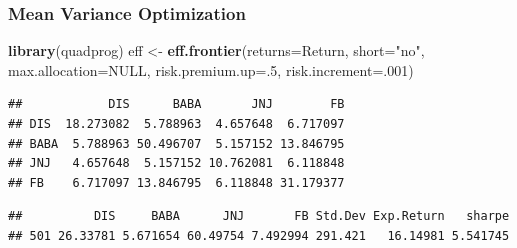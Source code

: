 \documentclass[]{article}
\newenvironment{Shaded}{\begin{snugshade}}{\end{snugshade}}
\newcommand{\KeywordTok}[1]{\textcolor[rgb]{0.13,0.29,0.53}{\textbf{#1}}}
\newcommand{\DataTypeTok}[1]{\textcolor[rgb]{0.13,0.29,0.53}{#1}}
\newcommand{\DecValTok}[1]{\textcolor[rgb]{0.00,0.00,0.81}{#1}}
\newcommand{\StringTok}[1]{\textcolor[rgb]{0.31,0.60,0.02}{#1}}
\newcommand{\OtherTok}[1]{\textcolor[rgb]{0.56,0.35,0.01}{#1}}
\newcommand{\OperatorTok}[1]{\textcolor[rgb]{0.81,0.36,0.00}{\textbf{#1}}}
\newcommand{\NormalTok}[1]{#1}
\begin{document}
\subsubsection{Mean Variance
Optimization}\label{mean-variance-optimization}

\begin{Shaded}
\begin{Highlighting}[]
\KeywordTok{library}\NormalTok{(quadprog)}
\NormalTok{eff <-}\StringTok{ }\KeywordTok{eff.frontier}\NormalTok{(}\DataTypeTok{returns=}\NormalTok{Return, }\DataTypeTok{short=}\StringTok{"no"}\NormalTok{, }\DataTypeTok{max.allocation=}\OtherTok{NULL}\NormalTok{, }\DataTypeTok{risk.premium.up=}\NormalTok{.}\DecValTok{5}\NormalTok{, }\DataTypeTok{risk.increment=}\NormalTok{.}\DecValTok{001}\NormalTok{)}
\end{Highlighting}
\end{Shaded}

\begin{verbatim}
##            DIS      BABA       JNJ        FB
## DIS  18.273082  5.788963  4.657648  6.717097
## BABA  5.788963 50.496707  5.157152 13.846795
## JNJ   4.657648  5.157152 10.762081  6.118848
## FB    6.717097 13.846795  6.118848 31.179377
\end{verbatim}

\begin{Shaded}
\end{Shaded}

\begin{verbatim}
##          DIS     BABA      JNJ       FB Std.Dev Exp.Return   sharpe
## 501 26.33781 5.671654 60.49754 7.492994 291.421   16.14981 5.541745
\end{verbatim}
\end{document}
